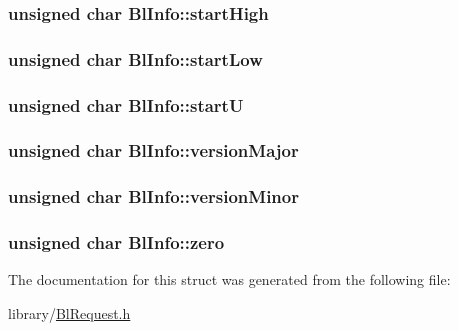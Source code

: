 \hypertarget{struct_bl_info_a952bed33ae2583318cb548e5af1ee0f7}{
\subsubsection[{start\-High}]{\setlength{\rightskip}{0pt plus 5cm}unsigned char Bl\-Info\-::start\-High}}\label{struct_bl_info_a952bed33ae2583318cb548e5af1ee0f7}
\hypertarget{struct_bl_info_a4d08750ac1951abfae43f350f11e6e74}{
\subsubsection[{start\-Low}]{\setlength{\rightskip}{0pt plus 5cm}unsigned char Bl\-Info\-::start\-Low}}\label{struct_bl_info_a4d08750ac1951abfae43f350f11e6e74}
\hypertarget{struct_bl_info_ad0ff495d980e4852f048e4b8f3f937aa}{
\subsubsection[{start\-U}]{\setlength{\rightskip}{0pt plus 5cm}unsigned char Bl\-Info\-::start\-U}}\label{struct_bl_info_ad0ff495d980e4852f048e4b8f3f937aa}
\hypertarget{struct_bl_info_adecf35498759a50f70cfd720930c2fee}{
\subsubsection[{version\-Major}]{\setlength{\rightskip}{0pt plus 5cm}unsigned char Bl\-Info\-::version\-Major}}\label{struct_bl_info_adecf35498759a50f70cfd720930c2fee}
\hypertarget{struct_bl_info_a013455b390e6a994503fc913ef4962ec}{
\subsubsection[{version\-Minor}]{\setlength{\rightskip}{0pt plus 5cm}unsigned char Bl\-Info\-::version\-Minor}}\label{struct_bl_info_a013455b390e6a994503fc913ef4962ec}
\hypertarget{struct_bl_info_a46dfaab15225f0149142be16b0976216}{
\subsubsection[{zero}]{\setlength{\rightskip}{0pt plus 5cm}unsigned char Bl\-Info\-::zero}}\label{struct_bl_info_a46dfaab15225f0149142be16b0976216}


The documentation for this struct was generated from the following file\-:\begin{DoxyCompactItemize}
\item 
library/\hyperlink{_bl_request_8h}{Bl\-Request.\-h}\end{DoxyCompactItemize}

